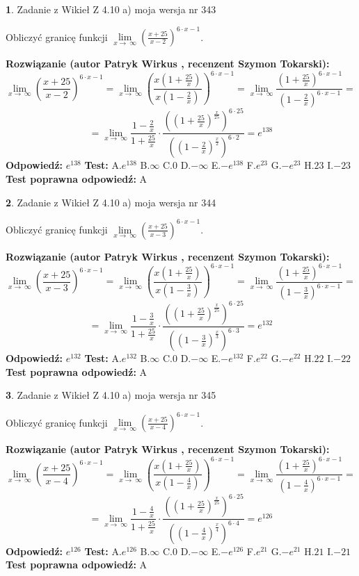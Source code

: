 \documentclass[12pt, a4paper]{article}
\theoremstyle{definition} %
\newtheorem{zad}{}
\newcommand{\zadStart}[1]{\begin{zad}#1\newline}
\newcommand{\zadStop}{\end{zad}}
\newcommand{\rozwStart}[2]{\noindent \textbf{Rozwiązanie (autor #1 , recenzent #2): }\newline}
\newcommand{\rozwStop}{\newline}
\newcommand{\odpStart}{\noindent \textbf{Odpowiedź:}\newline}
\newcommand{\odpStop}{\newline}
\newcommand{\testStart}{\noindent \textbf{Test:}\newline}
\newcommand{\testStop}{\newline}
\newcommand{\kluczStart}{\noindent \textbf{Test poprawna odpowiedź:}\newline}
\newcommand{\kluczStop}{\newline}
\begin{document}
\zadStart{Zadanie z Wikieł Z 4.10 a) moja wersja nr 343}

Obliczyć granicę funkcji  $\lim\limits_{x\to\ \infty}(\frac{x+25}{x-2})^{6\cdot x-1}$.
\zadStop
\rozwStart{Patryk Wirkus}{Szymon Tokarski}
$$\lim\limits_{x\to\ \infty}(\frac{x+25}{x-2})^{6\cdot x-1} = \lim\limits_{x\to\ \infty}(\frac{x(1+\frac{25}{x})}{x(1-\frac{2}{x})})^{6\cdot x-1}=\lim\limits_{x\to\ \infty}\frac{(1+\frac{25}{x})^{6\cdot x-1}}{(1-\frac{2}{x})^{6\cdot x-1}}=$$
$$=\lim\limits_{x\to\ \infty}\frac{1-\frac{2}{x}}{1+\frac{25}{x}}\cdot\frac{((1+\frac{25}{x})^{\frac{x}{25}})^{6\cdot25}}{((1-\frac{2}{x})^{\frac{x}{2}})^{6\cdot2}}=e^{138}$$
\rozwStop
\odpStart
$e^{138}$
\odpStop
\testStart
A.$e^{138}$ B.$\infty$ C.$0$ D.$-\infty$ E.$-e^{138}$
F.$e^{23}$ G.$-e^{23}$
H.$23$
I.$-23$
\testStop
\kluczStart
A
\kluczStop



\zadStart{Zadanie z Wikieł Z 4.10 a) moja wersja nr 344}

Obliczyć granicę funkcji  $\lim\limits_{x\to\ \infty}(\frac{x+25}{x-3})^{6\cdot x-1}$.
\zadStop
\rozwStart{Patryk Wirkus}{Szymon Tokarski}
$$\lim\limits_{x\to\ \infty}(\frac{x+25}{x-3})^{6\cdot x-1} = \lim\limits_{x\to\ \infty}(\frac{x(1+\frac{25}{x})}{x(1-\frac{3}{x})})^{6\cdot x-1}=\lim\limits_{x\to\ \infty}\frac{(1+\frac{25}{x})^{6\cdot x-1}}{(1-\frac{3}{x})^{6\cdot x-1}}=$$
$$=\lim\limits_{x\to\ \infty}\frac{1-\frac{3}{x}}{1+\frac{25}{x}}\cdot\frac{((1+\frac{25}{x})^{\frac{x}{25}})^{6\cdot25}}{((1-\frac{3}{x})^{\frac{x}{3}})^{6\cdot3}}=e^{132}$$
\rozwStop
\odpStart
$e^{132}$
\odpStop
\testStart
A.$e^{132}$ B.$\infty$ C.$0$ D.$-\infty$ E.$-e^{132}$
F.$e^{22}$ G.$-e^{22}$
H.$22$
I.$-22$
\testStop
\kluczStart
A
\kluczStop



\zadStart{Zadanie z Wikieł Z 4.10 a) moja wersja nr 345}

Obliczyć granicę funkcji  $\lim\limits_{x\to\ \infty}(\frac{x+25}{x-4})^{6\cdot x-1}$.
\zadStop
\rozwStart{Patryk Wirkus}{Szymon Tokarski}
$$\lim\limits_{x\to\ \infty}(\frac{x+25}{x-4})^{6\cdot x-1} = \lim\limits_{x\to\ \infty}(\frac{x(1+\frac{25}{x})}{x(1-\frac{4}{x})})^{6\cdot x-1}=\lim\limits_{x\to\ \infty}\frac{(1+\frac{25}{x})^{6\cdot x-1}}{(1-\frac{4}{x})^{6\cdot x-1}}=$$
$$=\lim\limits_{x\to\ \infty}\frac{1-\frac{4}{x}}{1+\frac{25}{x}}\cdot\frac{((1+\frac{25}{x})^{\frac{x}{25}})^{6\cdot25}}{((1-\frac{4}{x})^{\frac{x}{4}})^{6\cdot4}}=e^{126}$$
\rozwStop
\odpStart
$e^{126}$
\odpStop
\testStart
A.$e^{126}$ B.$\infty$ C.$0$ D.$-\infty$ E.$-e^{126}$
F.$e^{21}$ G.$-e^{21}$
H.$21$
I.$-21$
\testStop
\kluczStart
A
\kluczStop
\end{document}
